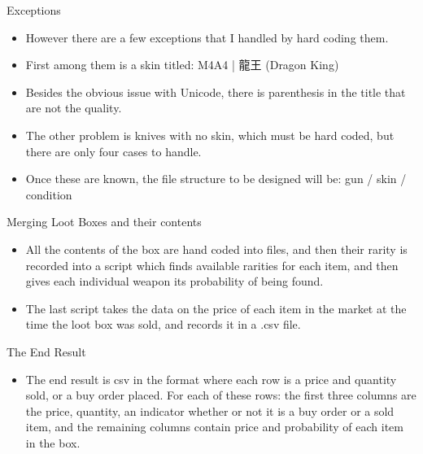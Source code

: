 \documentclass[bigger]{beamer}
\begin{document}
\begin{frame}[label=sec-3-2]{Exceptions}
\begin{itemize}
\item However there are a few exceptions that I handled by hard coding
them.
\item First among them is a skin titled: M4A4 | 龍王 (Dragon King)
\item Besides the obvious issue with Unicode, there is parenthesis in the
title that are not the quality.
\item The other problem is knives with no skin, which must be hard coded,
but there are only four cases to handle.
\item Once these are known, the file structure to be designed will be: gun
/ skin / condition
\end{itemize}
\end{frame}

\begin{frame}[label=sec-3-3]{Merging Loot Boxes and their contents}
\begin{itemize}
\item All the contents of the box are hand coded into files, and then
their rarity is recorded into a script which finds available
rarities for each item, and then gives each individual weapon its
probability of being found.
\item The last script takes the data on the price of each item in the market
at the time the loot box was sold, and records it in a .csv file.
\end{itemize}
\end{frame}

\begin{frame}[label=sec-3-4]{The End Result}
\begin{itemize}
\item The end result is csv in the format where each row is a price and
quantity sold, or a buy order placed. For each of these rows: the
first three columns are the price, quantity, an indicator whether or
not it is a buy order or a sold item, and the remaining columns contain
price and probability of each item in the box.
\end{itemize}
\end{frame}
\end{document}
